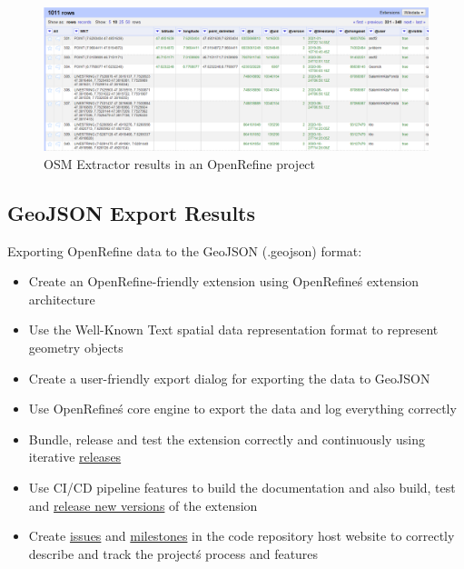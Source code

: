 \begin{figure}[H]
    \includegraphics[width=\linewidth]{./Figures/Results/osm_extractor_results}
    \caption{OSM Extractor results in an OpenRefine project}
\end{figure}
\subsection{GeoJSON Export Results}
Exporting OpenRefine data to the GeoJSON (.geojson) format:
\begin{itemize}
    \item Create an OpenRefine-friendly extension using OpenRefine\'s extension architecture
    \item Use the Well-Known Text spatial data representation format to represent geometry objects
    \item Create a user-friendly export dialog for exporting the data to GeoJSON
    \item Use OpenRefine\'s core engine to export the data and log everything correctly
    \item Bundle, release and test the extension correctly and continuously using iterative \href{https://gitlab.com/labiangashi/geojson-export/-/releases}{releases}
    \item Use CI/CD pipeline features to build the documentation and also build, test and \href{https://gitlab.com/labiangashi/geojson-export/-/releases}{release new versions} of the extension
    \item Create \href{https://gitlab.com/labiangashi/geojson-export/-/issues}{issues} and
    \href{https://gitlab.com/labiangashi/geojson-export/-/milestones}{milestones} in the code repository host website to correctly describe and
    track the project\'s process and features
\end{itemize}
